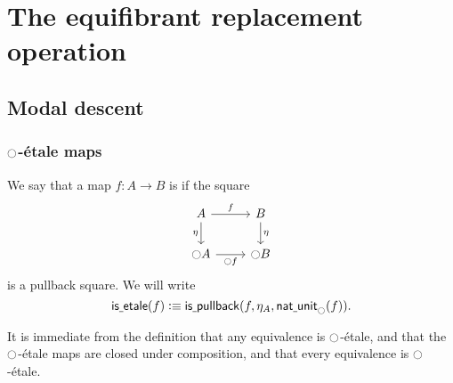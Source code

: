 \chapter{The equifibrant replacement operation}

\section{Modal descent}\label{sec:modal_descent}
\subsection{\texorpdfstring{${\ocircle}$}{○}-\'etale maps}

\begin{defn}
We say that a map $f:A\to B$ is  if the square
\begin{equation*}
\begin{tikzcd}
A \arrow[r,"f"] \arrow[d,swap,"\eta"] & B \arrow[d,"\eta"] \\
\modal A \arrow[r,swap,"\modal f"] & \modal B
\end{tikzcd}
\end{equation*}
is a pullback square. We will write
\begin{equation*}
\mathsf{is\underline{\ }{}etale}(f)\vcentcolon\equiv\mathsf{is\underline{\ }{}pullback}(f,\eta_A,\mathsf{nat\underline{\ }{}unit}_{\ocircle}(f)).
\end{equation*}
\end{defn}

It is immediate from the definition that any equivalence is ${\ocircle}$-\'etale, and that the ${\ocircle}$-\'etale maps are closed under composition, and that every equivalence is ${\ocircle}$-\'etale.

